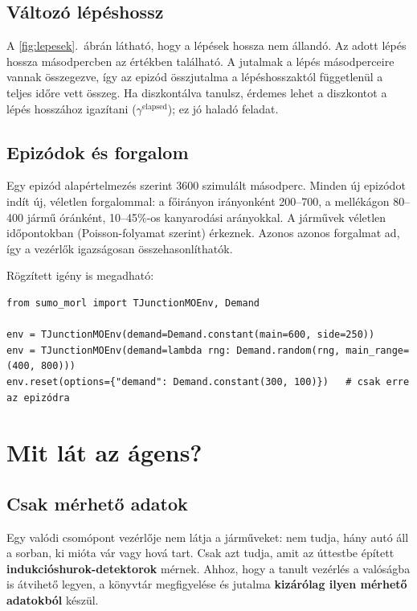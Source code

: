 \documentclass[11pt,a4paper]{article}
\begin{document}
\subsection{Változó lépéshossz}

A \ref{fig:lepesek}.~ábrán látható, hogy a lépések hossza nem állandó. Az adott lépés hossza
másodpercben az  értékben található. A jutalmak a lépés másodperceire vannak
összegezve, így az epizód összjutalma a lépéshosszaktól függetlenül a teljes időre vett összeg. Ha
diszkontálva tanulsz, érdemes lehet a diszkontot a lépés hosszához igazítani
($\gamma^{\text{elapsed}}$); ez jó haladó feladat.

\subsection{Epizódok és forgalom}

Egy epizód alapértelmezés szerint 3600 szimulált másodperc. Minden  új epizódot
indít új, véletlen forgalommal: a főirányon irányonként 200--700, a mellékágon 80--400 jármű óránként,
10--45\%-os kanyarodási arányokkal. A járművek véletlen időpontokban (Poisson-folyamat szerint)
érkeznek. Azonos  azonos forgalmat ad, így a vezérlők igazságosan összehasonlíthatók.

Rögzített igény is megadható:

\begin{lstlisting}
from sumo_morl import TJunctionMOEnv, Demand

env = TJunctionMOEnv(demand=Demand.constant(main=600, side=250))
env = TJunctionMOEnv(demand=lambda rng: Demand.random(rng, main_range=(400, 800)))
env.reset(options={"demand": Demand.constant(300, 100)})   # csak erre az epizódra
\end{lstlisting}

\section{Mit lát az ágens?}

\subsection{Csak mérhető adatok}

Egy valódi csomópont vezérlője nem látja a járműveket: nem tudja, hány autó áll a sorban, ki mióta
vár vagy hová tart. Csak azt tudja, amit az úttestbe épített \textbf{indukcióshurok-detektorok}
mérnek. Ahhoz, hogy a tanult vezérlés a valóságba is átvihető legyen, a könyvtár megfigyelése és
jutalma \textbf{kizárólag ilyen mérhető adatokból} készül.
\end{document}
